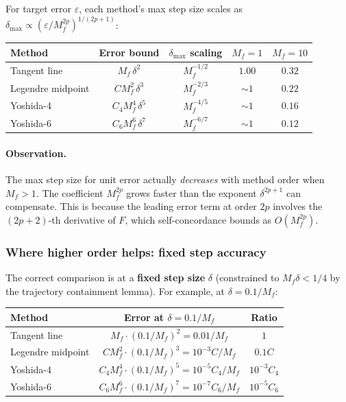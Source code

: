 \documentclass[11pt]{article}
\begin{document}
For target error $\varepsilon$, each method's max step size scales as
$\delta_{\max} \propto (\varepsilon / M_f^{2p})^{1/(2p+1)}$:

\begin{center}
\renewcommand{\arraystretch}{1.2}
\begin{tabular}{@{}lcccc@{}}
\toprule
\textbf{Method} & \textbf{Error bound} & \textbf{$\delta_{\max}$ scaling} &
  $M_f\!=\!1$ & $M_f\!=\!10$ \\
\midrule
Tangent line      & $M_f\,\delta^2$ & $M_f^{-1/2}$ &
  $1.00$ & $0.32$ \\
Legendre midpoint  & $C M_f^2\,\delta^3$ & $M_f^{-2/3}$ &
  $\sim\!1$ & $0.22$ \\
Yoshida-4         & $C_4 M_f^4\,\delta^5$ & $M_f^{-4/5}$ &
  $\sim\!1$ & $0.16$ \\
Yoshida-6         & $C_6 M_f^6\,\delta^7$ & $M_f^{-6/7}$ &
  $\sim\!1$ & $0.12$ \\
\bottomrule
\end{tabular}
\end{center}

\paragraph{Observation.}
The max step size for unit error actually \emph{decreases} with
method order when $M_f > 1$.  The coefficient $M_f^{2p}$ grows
faster than the exponent $\delta^{2p+1}$ can compensate.  This is
because the leading error term at order $2p$ involves the
$(2p+2)$-th derivative of $F$, which self-concordance bounds as
$O(M_f^{2p})$.

\subsubsection{Where higher order helps: fixed step accuracy}

The correct comparison is at a \textbf{fixed step size} $\delta$
(constrained to $M_f\delta < 1/4$ by the trajectory containment
lemma).  For example, at $\delta = 0.1 / M_f$:

\begin{center}
\renewcommand{\arraystretch}{1.2}
\begin{tabular}{@{}lcc@{}}
\toprule
\textbf{Method} & \textbf{Error at $\delta = 0.1/M_f$} & \textbf{Ratio} \\
\midrule
Tangent line      & $M_f \cdot (0.1/M_f)^2 = 0.01/M_f$ & $1$ \\
Legendre midpoint  & $C M_f^2 \cdot (0.1/M_f)^3 = 10^{-3} C / M_f$ & $0.1 C$ \\
Yoshida-4         & $C_4 M_f^4 \cdot (0.1/M_f)^5 = 10^{-5} C_4 / M_f$ & $10^{-3} C_4$ \\
Yoshida-6         & $C_6 M_f^6 \cdot (0.1/M_f)^7 = 10^{-7} C_6 / M_f$ & $10^{-5} C_6$ \\
\bottomrule
\end{tabular}
\end{center}
\end{document}
